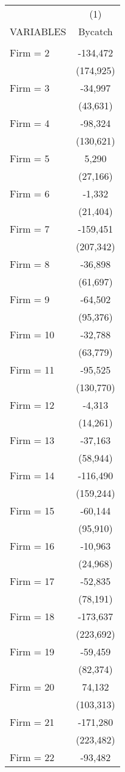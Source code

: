 \begin{tabular}{lc} \hline
 & (1) \\
VARIABLES & Bycatch \\ \hline
 &  \\
Firm = 2 & -134,472 \\
 & (174,925) \\
Firm = 3 & -34,997 \\
 & (43,631) \\
Firm = 4 & -98,324 \\
 & (130,621) \\
Firm = 5 & 5,290 \\
 & (27,166) \\
Firm = 6 & -1,332 \\
 & (21,404) \\
Firm = 7 & -159,451 \\
 & (207,342) \\
Firm = 8 & -36,898 \\
 & (61,697) \\
Firm = 9 & -64,502 \\
 & (95,376) \\
Firm = 10 & -32,788 \\
 & (63,779) \\
Firm = 11 & -95,525 \\
 & (130,770) \\
Firm = 12 & -4,313 \\
 & (14,261) \\
Firm = 13 & -37,163 \\
 & (58,944) \\
Firm = 14 & -116,490 \\
 & (159,244) \\
Firm = 15 & -60,144 \\
 & (95,910) \\
Firm = 16 & -10,963 \\
 & (24,968) \\
Firm = 17 & -52,835 \\
 & (78,191) \\
Firm = 18 & -173,637 \\
 & (223,692) \\
Firm = 19 & -59,459 \\
 & (82,374) \\
Firm = 20 & 74,132 \\
 & (103,313) \\
Firm = 21 & -171,280 \\
 & (223,482) \\
Firm = 22 & -93,482 \\

\end{tabular}
